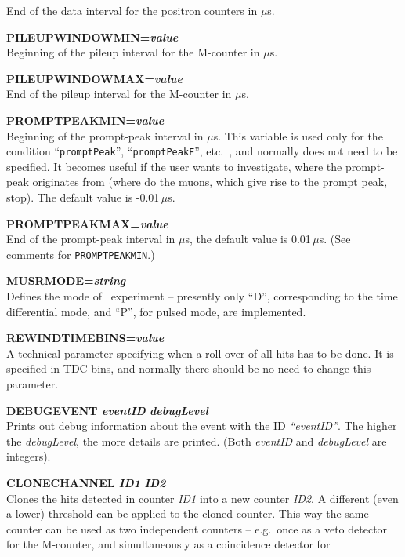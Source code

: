 \documentclass[twoside]{dis04}
\begin{document}
\begin{description}
         End of the data interval for the positron counters in $\mu$s.
   \item{\bf PILEUPWINDOWMIN=\emph{value}} \\ 
         Beginning of the pileup interval for the M-counter in $\mu$s.
   \item{\bf PILEUPWINDOWMAX=\emph{value}} \\ 
         End of the pileup interval for the M-counter in $\mu$s.
   \item{\bf PROMPTPEAKMIN=\emph{value}} \\ 
         Beginning of the prompt-peak interval in $\mu$s.  This variable is used only for the condition
	 ``{\tt promptPeak}'', ``{\tt promptPeakF}'', etc.\ , and normally does not need to be specified.  It becomes useful if
	 the user wants to investigate, where the prompt-peak originates from (where do the muons,
	 which give rise to the prompt peak, stop).  The default value is -0.01\,$\mu$s.
   \item{\bf PROMPTPEAKMAX=\emph{value}} \\ 
         End of the prompt-peak interval in $\mu$s, the default value is 0.01\,$\mu$s. (See comments 
	 for {\tt PROMPTPEAKMIN}.)
   \item{\bf MUSRMODE=\emph{string}} \\ 
         Defines the mode of \musr\ experiment -- presently only ``D'', corresponding to
	 the time differential mode, and ``P'', for pulsed mode, are implemented.
   \item{\bf REWINDTIMEBINS=\emph{value}} \\
         A technical parameter specifying when a roll-over of all hits has to be done.
	 It is specified in TDC bins, and normally there should be no need to change this parameter.
   \item{\bf DEBUGEVENT \emph{eventID} \emph{debugLevel}}\\
         Prints out debug information about the event with the ID \emph{``eventID''}.  
	 The higher the \emph{debugLevel}, the more details are printed.
	 (Both \emph{eventID} and \emph{debugLevel} are integers).
   \item{\bf CLONECHANNEL \emph{ID1} \emph{ID2}}\\
         Clones the hits detected in counter \emph{ID1} into a new counter \emph{ID2}.
	 A different (even a lower) threshold can be applied to the cloned counter.
	 This way the same counter can be used as two independent counters -- e.g.\ once as a veto
	 detector for the M-counter, and simultaneously as a coincidence detector for

\end{description}
\end{document}
